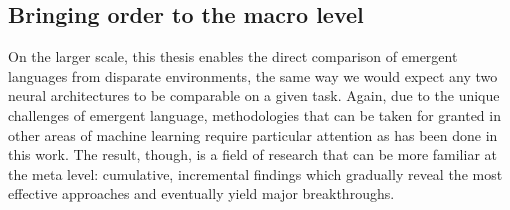 


\subsection{Bringing order to the macro level}
On the larger scale, this thesis enables the direct comparison of emergent languages from disparate environments, the same way we would expect any two neural architectures to be comparable on a given task.
Again, due to the unique challenges of emergent language, methodologies that can be taken for granted in other areas of machine learning require particular attention as has been done in this work.
The result, though, is a field of research that can be more familiar at the meta level: cumulative, incremental findings which gradually reveal the most effective approaches and eventually yield major breakthroughs.


